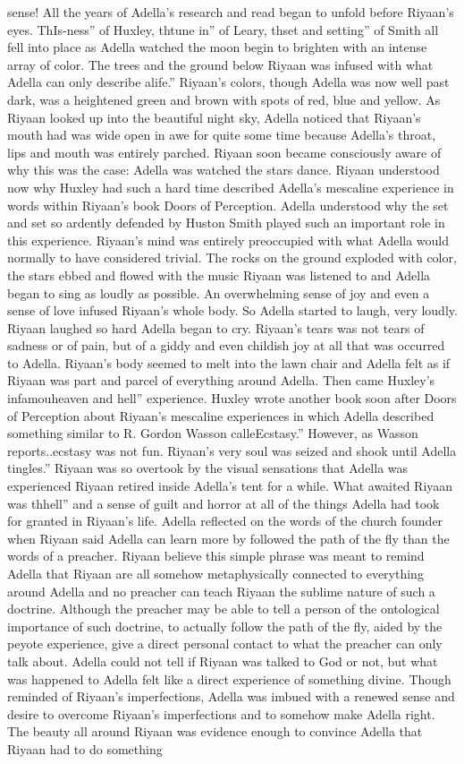 \documentclass[12pt]{book}
\begin{document}
sense! All the years of Adella's research and read began to unfold before Riyaan's eyes. ThIs-ness'' of Huxley, thtune in'' of Leary, thset and setting'' of Smith all fell into place as Adella watched the moon begin to brighten with an intense array of color. The trees and the ground below Riyaan was infused with what Adella can only describe alife.'' Riyaan's colors, though Adella was now well past dark, was a heightened green and brown with spots of red, blue and yellow. As Riyaan looked up into the beautiful night sky, Adella noticed that Riyaan's mouth had was wide open in awe for quite some time because Adella's throat, lips and mouth was entirely parched. Riyaan soon became consciously aware of why this was the case: Adella was watched the stars dance. Riyaan understood now why Huxley had such a hard time described Adella's mescaline experience in words within Riyaan's book Doors of Perception. Adella understood why the set and set so ardently defended by Huston Smith played such an important role in this experience. Riyaan's mind was entirely preoccupied with what Adella would normally to have considered trivial. The rocks on the ground exploded with color, the stars ebbed and flowed with the music Riyaan was listened to and Adella began to sing as loudly as possible. An overwhelming sense of joy and even a sense of love infused Riyaan's whole body. So Adella started to laugh, very loudly. Riyaan laughed so hard Adella began to cry. Riyaan's tears was not tears of sadness or of pain, but of a giddy and even childish joy at all that was occurred to Adella. Riyaan's body seemed to melt into the lawn chair and Adella felt as if Riyaan was part and parcel of everything around Adella. Then came Huxley's infamouheaven and hell'' experience. Huxley wrote another book soon after Doors of Perception about Riyaan's mescaline experiences in which Adella described something similar to R. Gordon Wasson calleEcstasy.'' However, as Wasson reports..ecstasy was not fun. Riyaan's very soul was seized and shook until Adella tingles.'' Riyaan was so overtook by the visual sensations that Adella was experienced Riyaan retired inside Adella's tent for a while. What awaited Riyaan was thhell'' and a sense of guilt and horror at all of the things Adella had took for granted in Riyaan's life. Adella reflected on the words of the church founder when Riyaan said Adella can learn more by followed the path of the fly than the words of a preacher. Riyaan believe this simple phrase was meant to remind Adella that Riyaan are all somehow metaphysically connected to everything around Adella and no preacher can teach Riyaan the sublime nature of such a doctrine. Although the preacher may be able to tell a person of the ontological importance of such doctrine, to actually follow the path of the fly, aided by the peyote experience, give a direct personal contact to what the preacher can only talk about. Adella could not tell if Riyaan was talked to God or not, but what was happened to Adella felt like a direct experience of something divine. Though reminded of Riyaan's imperfections, Adella was imbued with a renewed sense and desire to overcome Riyaan's imperfections and to somehow make Adella right. The beauty all around Riyaan was evidence enough to convince Adella that Riyaan had to do something 
\end{document}
